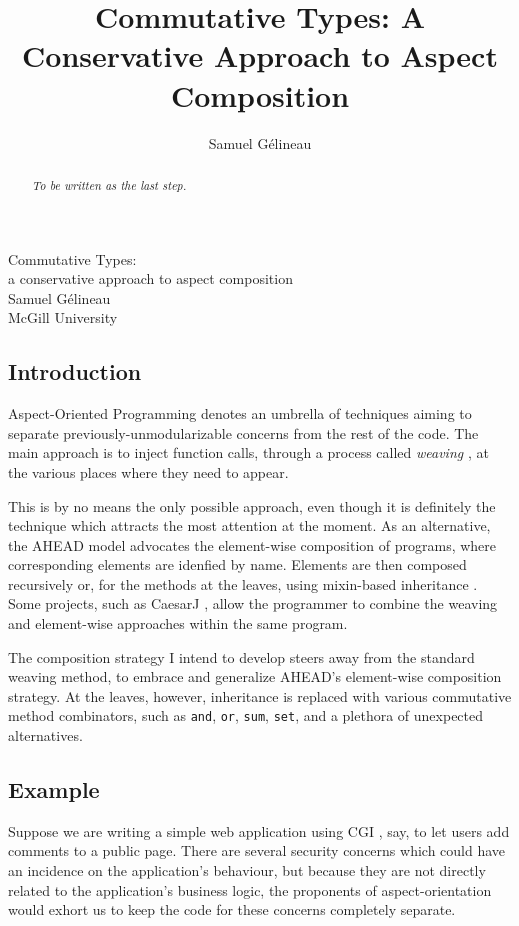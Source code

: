 \documentclass{article}
\title{Commutative Types: A Conservative Approach to Aspect Composition}
\author{Samuel G\'elineau}
\begin{document}
\begin{center}
{\larger[3] Commutative Types:}\\
{\larger[2] a conservative approach to aspect composition}\\
\vspace{\bigskipamount}
{\larger Samuel G\'elineau}\\
McGill University
\end{center}

\begin{abstract}\em
To be written as the last step.
\end{abstract}

\begin{multicols}{2}
\section{Introduction}\label{intro}\vspace{-\parskip}\hspace*{\parindent}
Aspect-Oriented Programming denotes an umbrella of techniques aiming to separate previously-unmodularizable concerns from the rest of the code. The main approach is to inject function calls, through a process called \emph{weaving} \cite{AOP}, at the various places where they need to appear.

This is by no means the only possible approach, even though it is definitely the technique which attracts the most attention at the moment. As an alternative, the AHEAD model \cite{AHEAD} advocates the element-wise composition of programs, where corresponding elements are idenfied by name. Elements are then composed recursively or, for the methods at the leaves, using mixin-based inheritance \cite{mixin}. Some projects, such as CaesarJ \cite{CaesarJ}, allow the programmer to combine the weaving and element-wise approaches within the same program.

The composition strategy I intend to develop steers away from the standard weaving method, to embrace and generalize AHEAD's element-wise composition strategy. At the leaves, however, inheritance is replaced with various commutative method combinators, such as \texttt{and}, \texttt{or}, \texttt{sum}, \texttt{set}, and a plethora of unexpected alternatives.

\subsection{Example}\label{intro-example}\vspace{-\parskip}\hspace*{\parindent}
Suppose we are writing a simple web application using CGI \cite{CGIbook, CGIeasy}, say, to let users add comments to a public page. There are several security concerns which could have an incidence on the application's behaviour, but because they are not directly related to the application's business logic, the proponents of aspect-orientation would exhort us to keep the code for these concerns completely separate.


\end{multicols}
\end{document}
